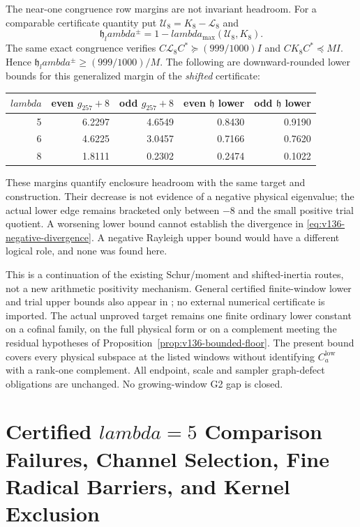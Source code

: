 \documentclass[11pt]{article}
\def\lambda{lambda}%
\theoremstyle{remark}
\begin{document}
The near-one congruence row margins are not invariant headroom.
For a comparable certificate quantity put
$\mathcal U_8=K_8-\mathcal L_8$ and
\[
 \mathfrak h_\lambda^\pm
 =1-\lambda_{\max}(\mathcal U_8,K_8).
\]
The same exact congruence verifies
$C\mathcal L_8C^*\succeq(999/1000)I$ and
$CK_8C^*\preceq M I$. Hence
$\mathfrak h_\lambda^\pm\ge(999/1000)/M$.
The following are downward-rounded lower bounds for this generalized
margin of the \emph{shifted} certificate:
\begin{center}
\begin{tabular}{rrrrr}
\toprule
$\lambda$ & even $g_{257}+8$ & odd $g_{257}+8$
 & even $\mathfrak h$ lower & odd $\mathfrak h$ lower\\
\midrule
5&6.2297&4.6549&0.8430&0.9190\\
6&4.6225&3.0457&0.7166&0.7620\\
8&1.8111&0.2302&0.2474&0.1022\\
\bottomrule
\end{tabular}
\end{center}
These margins quantify enclosure headroom with the same target and
construction. Their decrease is not evidence of a negative physical
eigenvalue; the actual lower edge remains bracketed only between
$-8$ and the small positive trial quotient. A worsening lower bound
cannot establish the divergence in
\eqref{eq:v136-negative-divergence}. A negative Rayleigh upper bound
would have a different logical role, and none was found here.

This is a continuation of the existing Schur/moment and shifted-inertia
routes, not a new arithmetic positivity mechanism. General certified
finite-window lower and trial upper bounds also appear in
\cite{Zhu2026}; no external numerical certificate is imported.
The actual unproved target remains one finite ordinary lower constant
on a cofinal family, on the full physical form or on a complement
meeting the residual hypotheses of Proposition~\ref{prop:v136-bounded-floor}.
The present bound covers every physical subspace at the listed windows
without identifying $C_a^{\mathrm{low}}$ with a rank-one complement.
All endpoint, scale and sampler graph-defect obligations are unchanged.
No growing-window G2 gap is closed.



\section{Certified \texorpdfstring{\texorpdfstring{$\lambda=5$}{lambda=5}}{lambda=5} Comparison Failures, Channel Selection, Fine Radical Barriers, and Kernel Exclusion}\label{sec:pillar3b}
\end{document}

